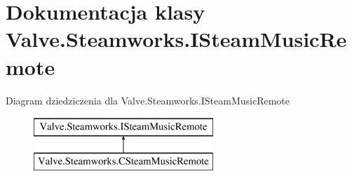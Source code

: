 \hypertarget{class_valve_1_1_steamworks_1_1_i_steam_music_remote}{}\section{Dokumentacja klasy Valve.\+Steamworks.\+I\+Steam\+Music\+Remote}
\label{class_valve_1_1_steamworks_1_1_i_steam_music_remote}
Diagram dziedziczenia dla Valve.\+Steamworks.\+I\+Steam\+Music\+Remote\begin{figure}[H]
\begin{center}
\leavevmode
\includegraphics[height=2.000000cm]{class_valve_1_1_steamworks_1_1_i_steam_music_remote}
\end{center}
\end{figure}

